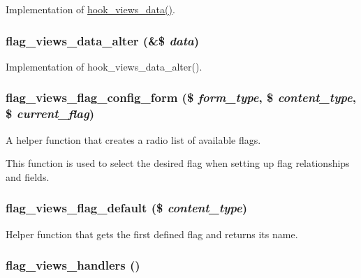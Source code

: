 Implementation of \hyperlink{group__views__hooks_g227057901681e4a33e33c199c7a8c989}{hook\_\-views\_\-data()}. \hypertarget{flag_8views_8inc_e0c74ad5be4bee80cc979f85745627df}{
\subsubsection[{flag\_\-views\_\-data\_\-alter}]{\setlength{\rightskip}{0pt plus 5cm}flag\_\-views\_\-data\_\-alter (\&\$ {\em data})}}
\label{flag_8views_8inc_e0c74ad5be4bee80cc979f85745627df}


Implementation of hook\_\-views\_\-data\_\-alter(). \hypertarget{flag_8views_8inc_aa59ed9d07abe2c7daa77f794df9467d}{
\subsubsection[{flag\_\-views\_\-flag\_\-config\_\-form}]{\setlength{\rightskip}{0pt plus 5cm}flag\_\-views\_\-flag\_\-config\_\-form (\$ {\em form\_\-type}, \/  \$ {\em content\_\-type}, \/  \$ {\em current\_\-flag})}}
\label{flag_8views_8inc_aa59ed9d07abe2c7daa77f794df9467d}


A helper function that creates a radio list of available flags.

This function is used to select the desired flag when setting up flag relationships and fields. \hypertarget{flag_8views_8inc_e698abaaeb67252d5874ed5fd39c6284}{
\subsubsection[{flag\_\-views\_\-flag\_\-default}]{\setlength{\rightskip}{0pt plus 5cm}flag\_\-views\_\-flag\_\-default (\$ {\em content\_\-type})}}
\label{flag_8views_8inc_e698abaaeb67252d5874ed5fd39c6284}


Helper function that gets the first defined flag and returns its name. \hypertarget{flag_8views_8inc_fda81baae0ede154b2d8717945b22c8e}{
\subsubsection[{flag\_\-views\_\-handlers}]{\setlength{\rightskip}{0pt plus 5cm}flag\_\-views\_\-handlers ()}}
\label{flag_8views_8inc_fda81baae0ede154b2d8717945b22c8e}


